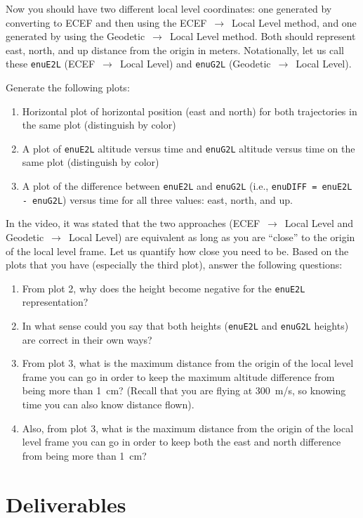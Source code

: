 \documentclass[12pt]{article}
\begin{document}
Now you should have two different local level coordinates: one generated by
converting to ECEF and then using the ECEF~$\to$~Local Level method, and one
generated by using the Geodetic~$\to$~Local Level method.  Both should represent
east, north, and up distance from the origin in meters.  Notationally, let us
call these \texttt{enuE2L} (ECEF~$\to$~Local Level) and \texttt{enuG2L}
(Geodetic~$\to$~Local Level).

Generate the following plots:
\begin{enumerate}
   \item Horizontal plot of horizontal position (east and north) for both
      trajectories in the same plot (distinguish by color)
   \item A plot of \texttt{enuE2L} altitude versus time and \texttt{enuG2L}
      altitude versus time on the same plot (distinguish by color)
   \item A plot of the difference between \texttt{enuE2L} and \texttt{enuG2L}
      (i.e., \texttt{enuDIFF = enuE2L - enuG2L}) versus time for all three
      values: east, north, and up.
\end{enumerate}

In the video, it was stated that the two approaches (ECEF~$\to$~Local Level and
Geodetic~$\to$~Local Level) are equivalent as long as you are ``close'' to the
origin of the local level frame.  Let us quantify how close you need to be.
Based on the plots that you have (especially the third plot), answer the
following questions:
\begin{enumerate}
   \item From plot 2, why does the height become negative for the
      \texttt{enuE2L} representation?
   \item In what sense could you say that both heights (\texttt{enuE2L} and
      \texttt{enuG2L} heights) are correct in their own ways?
   \item From plot 3, what is the maximum distance from the origin of the local
      level frame you can go in order to keep the maximum altitude difference
      from being more than 1~cm?  (Recall that you are flying at 300~m/s, so
      knowing time you can also know distance flown).
   \item Also, from plot 3, what is the maximum distance from the origin of the
      local level frame you can go in order to keep both the east and north
      difference from being more than 1~cm?
\end{enumerate}

\section*{\textsf{Deliverables}}
\end{document}
